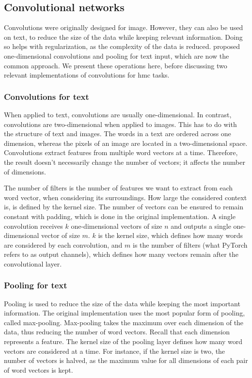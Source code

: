 \subsection{Convolutional networks} \label{hmc_cnn}

Convolutions were originally designed for image. However, they can also be used on text, to reduce the size of the data while keeping relevant information. Doing so helps with regularization, as the complexity of the data is reduced. \cite{kim2014convolutional} proposed one-dimensional convolutions and pooling for text input, which are now the common approach. We present these operations here, before discussing two relevant implementations of convolutions for \acrshort{hmc} tasks.

\subsubsection{Convolutions for text}

When applied to text, convolutions are usually one-dimensional. In contrast, convolutions are two-dimensional when applied to images. This has to do with the structure of text and images. The words in a text are ordered across one dimension, whereas the pixels of an image are located in a two-dimensional space. Convolutions extract features from multiple word vectors at a time. Therefore, the result doesn't necessarily change the number of vectors; it affects the number of dimensions.

The number of filters is the number of features we want to extract from each word vector, when considering its surroundings. How large the considered context is, is defined by the kernel size. The number of vectors can be ensured to remain constant with padding, which is done in the original implementation. A single convolution receives $k$ one-dimensional vectors of size $n$ and outputs a single one-dimensional vector of size $m$. $k$ is the kernel size, which defines how many words are considered by each convolution, and $m$ is the number of filters (what PyTorch refers to as output channels), which defines how many vectors remain after the convolutional layer.

\subsubsection{Pooling for text}

Pooling is used to reduce the size of the data while keeping the most important information. The original implementation uses the most popular form of pooling, called max-pooling. Max-pooling takes the maximum over each dimension of the data, thus reducing the number of word vectors. Recall that each dimension represents a feature. The kernel size of the pooling layer defines how many word vectors are considered at a time. For instance, if the kernel size is two, the number of vectors is halved, as the maximum value for all dimensions of each pair of word vectors is kept.

